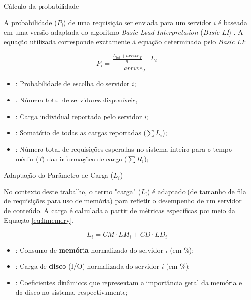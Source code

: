 \documentclass[10pt]{beamer}
\begin{document}
\begin{frame}{Cálculo da probabilidade}

A probabilidade ($P_i$) de uma requisição ser enviada para um servidor $i$ é baseada em uma versão adaptada do algoritmo \textit{Basic Load Interpretation} (\textit{Basic LI}) \cite{interpretingStaleLoadInformation2000}. A equação utilizada corresponde exatamente à equação determinada pelo \textit{Basic LI}:

\begin{equation}\label{eq:basic_li}
    P_{i}=\frac{\frac{L_{tot}+arrive_{T}}{n}-L_{i}}{arrive_{T}}
\end{equation}

\begin{center}
\begin{minipage}{0.9\textwidth}
\begin{itemize}
    \item[$P_i$]: Probabilidade de escolha do servidor $i$;
    \item[$n$]: Número total de servidores disponíveis;
    \item[$L_i$]: Carga individual reportada pelo servidor $i$;
    \item[$L_{tot}$]: Somatório de todas as cargas reportadas ($\sum L_i$);
    \item[$arrive_T$]: Número total de requisições esperadas no sistema inteiro para o tempo médio ($T$) das informações de carga ($\sum R_i$);
\end{itemize}
\end{minipage}
\end{center}

\end{frame}

\begin{frame}{Adaptação do Parâmetro de Carga ($L_i$)}

No contexto deste trabalho, o termo "carga" ($L_i$) é adaptado (de tamanho de fila de requisições para uso de memória) para refletir o desempenho de um servidor de conteúdo. A carga é calculada a partir de métricas específicas por meio da Equação \ref{eq:limemory}.

\begin{equation}\label{eq:limemory}
    L_i = CM \cdot LM_i + CD \cdot LD_i
\end{equation}

\begin{center}
\begin{minipage}{0.8\textwidth}
\begin{itemize}
    \item[$LM_i$]: Consumo de \textbf{memória} normalizado do servidor $i$ (em \%);
    \bigskip
    \item[$LD_i$]: Carga de \textbf{disco} (I/O) normalizada do servidor $i$ (em \%);
    \bigskip
    \item[$CM, CD$]: Coeficientes dinâmicos que representam a importância geral da memória e do disco no sistema, respectivamente;
\end{itemize}
\end{minipage}
\end{center}

\end{frame}
\end{document}
